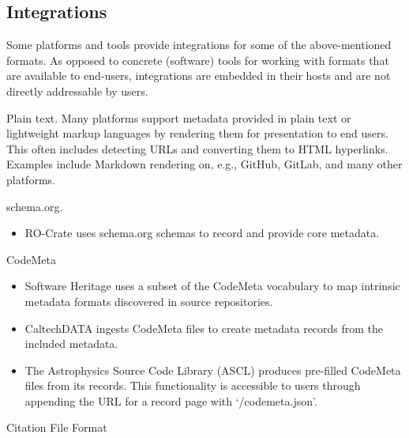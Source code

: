 \documentclass{article}
\begin{document}
\subsection{Integrations}\label{subsec:metadata-integrations}
Some platforms and tools provide integrations for some of the above-mentioned formats. As opposed to concrete (software) tools for working with formats that are available to end-users, integrations are embedded in their hosts and are not directly addressable by users.

Plain text. Many platforms support metadata provided in plain text or lightweight markup languages by rendering them for presentation to end users. This often includes detecting URLs and converting them to HTML hyperlinks. Examples include Markdown rendering on, e.g., GitHub, GitLab, and many other platforms.

schema.org.

\begin{itemize}  
\item  RO-Crate uses schema.org schemas to record and provide core metadata.


\end{itemize}CodeMeta 

\begin{itemize}  
\item Software Heritage uses a subset of the CodeMeta vocabulary to map intrinsic metadata formats discovered in source repositories.


\item CaltechDATA ingests CodeMeta files to create metadata records from the included metadata.


\item The Astrophysics Source Code Library (ASCL) produces pre-filled CodeMeta files from its records. This functionality is accessible to users through appending the URL for a record page with ‘/codemeta.json’.


\end{itemize}Citation File Format 
\end{document}
